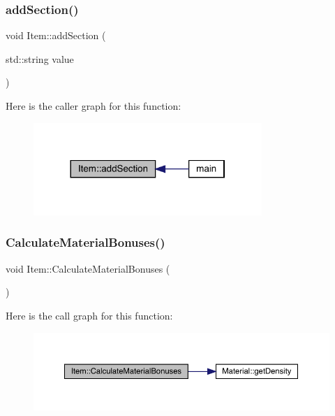 \subsubsection{\texorpdfstring{add\+Section()}{addSection()}}
{\footnotesize\ttfamily void Item\+::add\+Section (\begin{DoxyParamCaption}\item[{std\+::string}]{value }\end{DoxyParamCaption})}

Here is the caller graph for this function\+:
\nopagebreak
\begin{figure}[H]
\begin{center}
\leavevmode
\includegraphics[width=245pt]{class_item_a6c9f73ef36b176cdb75bc9b13d5be8e8_icgraph}
\end{center}
\end{figure}
\mbox{\label{class_item_a8f02bc86b6f66142e35a660a5c28ba74}} 
\subsubsection{\texorpdfstring{Calculate\+Material\+Bonuses()}{CalculateMaterialBonuses()}}
{\footnotesize\ttfamily void Item\+::\+Calculate\+Material\+Bonuses (\begin{DoxyParamCaption}{ }\end{DoxyParamCaption})}

Here is the call graph for this function\+:
\nopagebreak
\begin{figure}[H]
\begin{center}
\leavevmode
\includegraphics[width=350pt]{class_item_a8f02bc86b6f66142e35a660a5c28ba74_cgraph}
\end{center}
\end{figure}
\mbox{\label{class_item_a6d963581e2caad2e08979683a827f39f}} 
